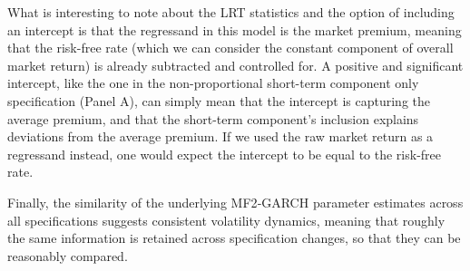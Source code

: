 \documentclass[12pt]{article}
\begin{document}
What is interesting to note about the LRT statistics and the option of including an intercept is that the regressand in this model is the market premium, meaning that the risk-free rate (which we can consider the constant component of overall market return) is already subtracted and controlled for. A positive and significant intercept, like the one in the non-proportional short-term component only specification (Panel A), can simply mean that the intercept is capturing the average premium, and that the short-term component's inclusion explains deviations from the average premium. If we used the raw market return as a regressand instead, one would expect the intercept to be equal to the risk-free rate.\par
Finally, the similarity of the underlying MF2‑GARCH  parameter estimates across all specifications suggests consistent volatility dynamics, meaning that roughly the same information is retained across specification changes, so that they can be reasonably compared.
\end{document}
